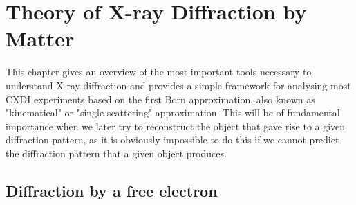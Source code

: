 \chapter{Theory of X-ray Diffraction by Matter}\label{diffraction_theory}\noindent

This chapter gives an overview of the most important tools necessary to
understand X-ray diffraction and provides a simple framework for analysing most
CXDI experiments based on the first Born approximation, also known as
"kinematical" or "single-scattering" approximation. This will be of fundamental
importance when we later try to reconstruct the object that gave rise to a given
diffraction pattern, as  it is obviously impossible to do this if we cannot
predict the diffraction pattern that a given object produces.

\section{Diffraction by a free electron}\label{diffraction_physics}

